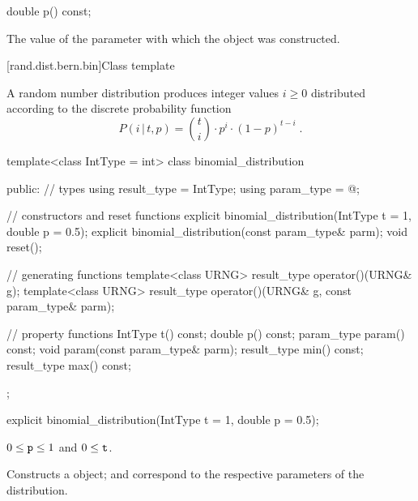 %
%
\begin{itemdecl}
double p() const;
\end{itemdecl}

\begin{itemdescr}
\pnum\returns The value of the  parameter
 with which the object was constructed.
\end{itemdescr}


[rand.dist.bern.bin]{Class template }%
%

\pnum
A  random number distribution
produces integer values $i \geq 0$
distributed according to
the discrete probability function%
%
\[%
 P(i\,|\,t,p)
      = \binom{t}{i} \cdot p^i \cdot (1-p)^{t-i}
\; \mbox{.}
\]

\begin{codeblock}
template<class IntType = int>
 class binomial_distribution
{
public:
 // types
 using result_type = IntType;
 using param_type  = @\unspec@;

 // constructors and reset functions
 explicit binomial_distribution(IntType t = 1, double p = 0.5);
 explicit binomial_distribution(const param_type& parm);
 void reset();

 // generating functions
 template<class URNG>
   result_type operator()(URNG& g);
 template<class URNG>
   result_type operator()(URNG& g, const param_type& parm);

 // property functions
 IntType t() const;
 double p() const;
 param_type param() const;
 void param(const param_type& parm);
 result_type min() const;
 result_type max() const;
};
\end{codeblock}


%
\begin{itemdecl}
explicit binomial_distribution(IntType t = 1, double p = 0.5);
\end{itemdecl}

\begin{itemdescr}
\pnum\requires
 $0 \leq \texttt{p} \leq 1$ and $0 \leq \texttt{t} $.

\pnum\effects Constructs a  object;
  and 
 correspond to the respective parameters of the distribution.
\end{itemdescr}

